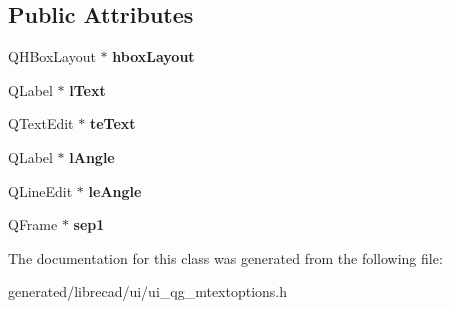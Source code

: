\subsection*{Public Attributes}
\begin{DoxyCompactItemize}
\item 
\hypertarget{classUi__QG__MTextOptions_ac0240b45456733b642075da4b6b8eda2}{Q\-H\-Box\-Layout $\ast$ {\bfseries hbox\-Layout}}\label{classUi__QG__MTextOptions_ac0240b45456733b642075da4b6b8eda2}

\item 
\hypertarget{classUi__QG__MTextOptions_a5f80557893758df4ae630574afeca109}{Q\-Label $\ast$ {\bfseries l\-Text}}\label{classUi__QG__MTextOptions_a5f80557893758df4ae630574afeca109}

\item 
\hypertarget{classUi__QG__MTextOptions_a0f79ff9f2a086a22292ec917dcddc2d0}{Q\-Text\-Edit $\ast$ {\bfseries te\-Text}}\label{classUi__QG__MTextOptions_a0f79ff9f2a086a22292ec917dcddc2d0}

\item 
\hypertarget{classUi__QG__MTextOptions_a235717b932c5661989f99f842e5c5caa}{Q\-Label $\ast$ {\bfseries l\-Angle}}\label{classUi__QG__MTextOptions_a235717b932c5661989f99f842e5c5caa}

\item 
\hypertarget{classUi__QG__MTextOptions_ac1a40594644dc1b24f51778f1d31ef4c}{Q\-Line\-Edit $\ast$ {\bfseries le\-Angle}}\label{classUi__QG__MTextOptions_ac1a40594644dc1b24f51778f1d31ef4c}

\item 
\hypertarget{classUi__QG__MTextOptions_a3c589d219c4e6ec803406ad8f72e0850}{Q\-Frame $\ast$ {\bfseries sep1}}\label{classUi__QG__MTextOptions_a3c589d219c4e6ec803406ad8f72e0850}

\end{DoxyCompactItemize}


The documentation for this class was generated from the following file\-:\begin{DoxyCompactItemize}
\item 
generated/librecad/ui/ui\-\_\-qg\-\_\-mtextoptions.\-h\end{DoxyCompactItemize}
